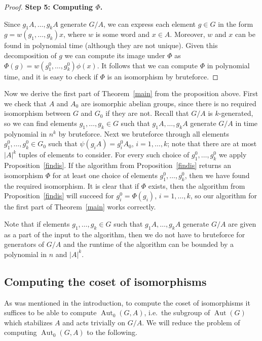 \documentclass{article}
\DeclareMathOperator{\Aut}{Aut}
\begin{document}
\begin{proof}
	\noindent
	\textbf{Step 5: Computing \( \Phi \).}
	\medskip

	Since \( g_1A, \dots, g_kA \) generate \( G/A \), we can express each element \( g \in G \)
	in the form \( g = w(g_1, \dots, g_k)x \), where \( w \) is some word and \( x \in A \).
	Moreover, \( w \) and \( x \) can be found in polynomial time (although they are not unique).
	Given this decomposition of \( g \) we can compute its image under \( \Phi \) as \( \Phi(g) = w(g_1^0, \dots, g_k^0) \phi(x) \).
	It follows that we can compute \( \Phi \) in polynomial time, and it is easy to check if \( \Phi \) is an isomorphism by bruteforce.
\end{proof}

Now we derive the first part of Theorem~\ref{main} from the proposition above.
First we check that \( A \) and \( A_0 \) are isomorphic abelian groups, since there is no required isomorphism between \( G \) and \( G_0 \) if they are not.
Recall that \( G/A \) is \( k \)-generated, so we can find elements \( g_1, \dots, g_k \in G \) such that \( g_1A, \dots, g_kA \) generate \( G/A \) in
time polynomial in \( n^k \) by bruteforce. Next we bruteforce through all elements \( g^0_1, \dots, g^0_k \in G_0 \) such that
\( \psi(g_iA) = g^0_iA_0 \), \( i = 1, \dots, k \); note that there are at most \( |A|^k \) tuples of elements to consider.
For every such choice of \( g^0_1, \dots, g^0_k \) we apply Proposition~\ref{findis}. If the algorithm from Proposition~\ref{findis}
returns an isomorphism \( \Phi \) for at least one choice of elements \( g^0_1, \dots, g^0_k \), then we have found the required isomorphism.
It is clear that if \( \Phi \) exists, then the algorithm from Proposition~\ref{findis} will succeed for \( g^0_i = \Phi(g_i) \), \( i = 1, \dots, k \),
so our algorithm for the first part of Theorem~\ref{main} works correctly.

Note that if elements \( g_1, \dots, g_k \in G \) such that \( g_1A, \dots, g_kA \) generate \( G/A \) are given as a part of the input to the algorithm,
then we do not have to bruteforce for generators of \( G/A \) and the runtime of the algorithm can be bounded by a polynomial in \( n \) and \( |A|^k \).

\subsection{Computing the coset of isomorphisms}

As was mentioned in the introduction, to compute the coset of isomorphisms it suffices to
be able to compute \( \Aut_0(G, A) \), i.e.\ the subgroup of \( \Aut(G) \) which stabilizes \( A \) and acts trivially on \( G/A \).
We will reduce the problem of computing \( \Aut_0(G, A) \) to the following.
\end{document}
